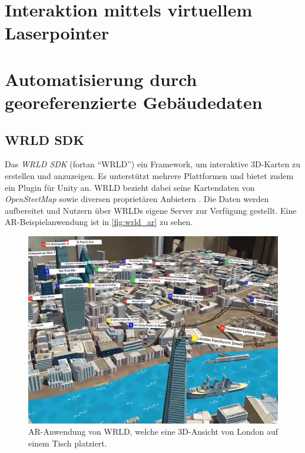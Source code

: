 \section{Interaktion mittels virtuellem Laserpointer}

\section{Automatisierung durch georeferenzierte Gebäudedaten}

\subsection{WRLD SDK}

Das \emph{WRLD SDK} (fortan \enquote{WRLD}) ein Framework, um interaktive 3D-Karten zu erstellen und anzuzeigen.
Es unterstützt mehrere Plattformen und bietet zudem ein Plugin für Unity an.
WRLD bezieht dabei seine Kartendaten von \emph{OpenSteetMap} sowie diversen proprietären Anbietern \parencite{WRLD2018}.
Die Daten werden aufbereitet und Nutzern über WRLDs eigene Server zur Verfügung gestellt.
Eine AR-Beispielanwendung ist in \autoref{fig:wrld_ar} zu sehen.
\begin{figure}
    \centering
    \includegraphics[width=\textwidth]{figures/wrld_ar-web-11}
    \caption{AR-Anwendung von WRLD, welche eine 3D-Ansicht von London auf einem Tisch platziert. }
    \label{fig:wrld_ar}
\end{figure}

